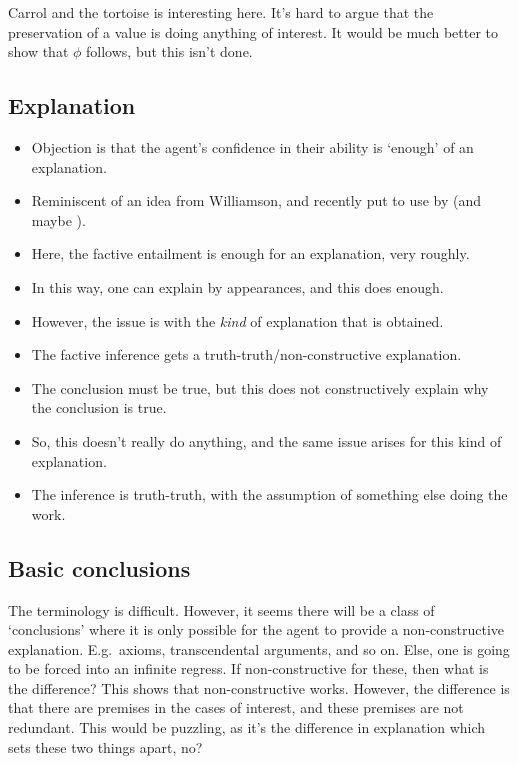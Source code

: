 \documentclass[10pt]{article}
\begin{document}
\begin{note}[Carrol]
  Carrol and the tortoise is interesting here.
  It's hard to argue that the preservation of a value is doing anything of interest.
  It would be much better to show that \(\phi\) follows, but this isn't done.
\end{note}


\subsection{Explanation}
\label{sec:explanation}

\begin{itemize}
\item Objection is that the agent's confidence in their ability is `enough' of an explanation.
\item Reminiscent of an idea from Williamson, and recently put to use by \citeauthor{Lord:2018aa} (and maybe \citeauthor{Kiesewetter:2017aa}).
\item Here, the factive entailment is enough for an explanation, very roughly.
\item In this way, one can explain by appearances, and this does enough.
\item However, the issue is with the \emph{kind} of explanation that is obtained.
\item The factive inference gets a truth-truth/non-constructive explanation.
\item The conclusion must be true, but this does not constructively explain why the conclusion is true.
\item So, this doesn't really do anything, and the same issue arises for this kind of explanation.
\item The inference is truth-truth, with the assumption of something else doing the work.
\end{itemize}

\subsection{Basic conclusions}
\label{sec:basic-conclusions}

The terminology is difficult.
However, it seems there will be a class of `conclusions' where it is only possible for the agent to provide a non-constructive explanation.
E.g.\ axioms, transcendental arguments, and so on.
Else, one is going to be forced into an infinite regress.
If non-constructive for these, then what is the difference?
This shows that non-constructive works.
However, the difference is that there are premises in the cases of interest, and these premises are not redundant.
This would be puzzling, as it's the difference in explanation which sets these two things apart, no?
\end{document}
